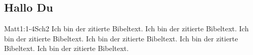 \subsection{Hallo Du}
\begin{bibeltext}{Matt}{1:1-4}{Sch2}
	Ich bin der zitierte Bibeltext. Ich bin der zitierte Bibeltext. Ich bin der zitierte Bibeltext. Ich bin der zitierte Bibeltext. Ich bin der zitierte Bibeltext. Ich bin der zitierte Bibeltext.
\end{bibeltext}